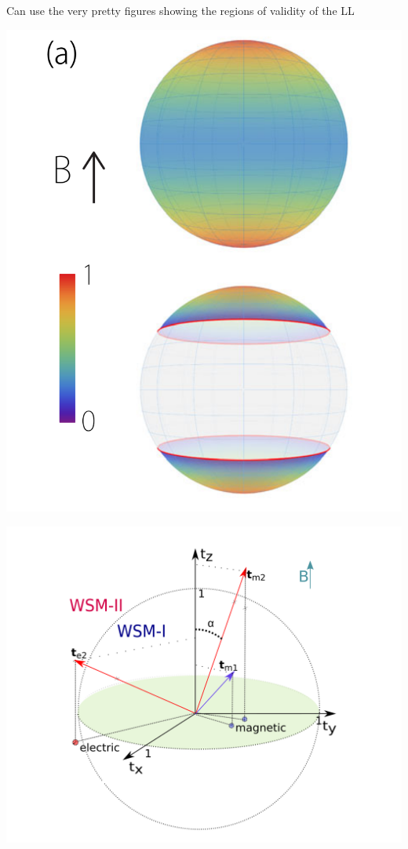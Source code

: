 \documentclass[11pt]{article}
\begin{document}
Can use the very pretty figures showing the regions of validity of the LL
\begin{center}
\includegraphics[width=.9\linewidth]{figures/typeii_ll_region_yu.png}
\end{center}

\begin{center}
\includegraphics[width=.9\linewidth]{figures/typeii_ll_region_Tchoumakov.png}
\end{center}
\end{document}
